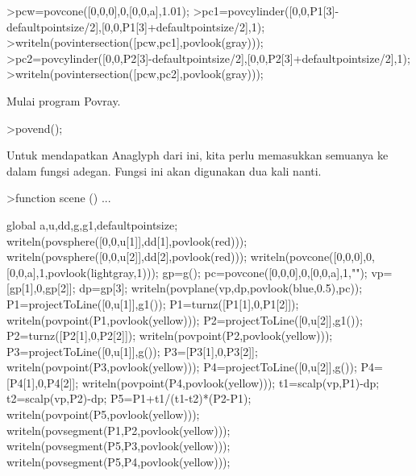 \documentclass[12pt,arial,letterpaper]{book}
\begin{document}
\begin{eulercomment}
\begin{eulercomment}
\begin{eulercomment}
\begin{eulercomment}
\begin{eulercomment}
\begin{eulercomment}
\begin{eulercomment}
\begin{eulercomment}
\begin{eulercomment}
\begin{eulercomment}
\begin{eulercomment}
\begin{eulercomment}
\begin{eulercomment}
\begin{eulercomment}
\begin{eulercomment}
\begin{eulercomment}
\begin{eulercomment}
\begin{eulercomment}
\begin{eulercomment}
\begin{eulercomment}
\begin{eulercomment}
\begin{eulercomment}
\begin{eulercomment}
\begin{eulercomment}
\begin{eulercomment}
\begin{eulercomment}
\begin{eulercomment}
\begin{eulercomment}
\begin{eulercomment}
\begin{eulercomment}
\begin{eulerprompt}
>pcw=povcone([0,0,0],0,[0,0,a],1.01);
>pc1=povcylinder([0,0,P1[3]-defaultpointsize/2],[0,0,P1[3]+defaultpointsize/2],1);
>writeln(povintersection([pcw,pc1],povlook(gray)));
>pc2=povcylinder([0,0,P2[3]-defaultpointsize/2],[0,0,P2[3]+defaultpointsize/2],1);
>writeln(povintersection([pcw,pc2],povlook(gray)));
\end{eulerprompt}
\begin{eulercomment}
Mulai program Povray.
\end{eulercomment}
\begin{eulerprompt}
>povend();
\end{eulerprompt}
\begin{eulercomment}
Untuk mendapatkan Anaglyph dari ini, kita perlu memasukkan semuanya ke
dalam fungsi adegan. Fungsi ini akan digunakan dua kali nanti.
\end{eulercomment}
\begin{eulerprompt}
>function scene () ...
\end{eulerprompt}
\begin{eulerudf}
  global a,u,dd,g,g1,defaultpointsize;
  writeln(povsphere([0,0,u[1]],dd[1],povlook(red)));
  writeln(povsphere([0,0,u[2]],dd[2],povlook(red)));
  writeln(povcone([0,0,0],0,[0,0,a],1,povlook(lightgray,1)));
  gp=g();
  pc=povcone([0,0,0],0,[0,0,a],1,"");
  vp=[gp[1],0,gp[2]]; dp=gp[3];
  writeln(povplane(vp,dp,povlook(blue,0.5),pc));
  P1=projectToLine([0,u[1]],g1()); P1=turnz([P1[1],0,P1[2]]);
  writeln(povpoint(P1,povlook(yellow)));
  P2=projectToLine([0,u[2]],g1()); P2=turnz([P2[1],0,P2[2]]);
  writeln(povpoint(P2,povlook(yellow)));
  P3=projectToLine([0,u[1]],g()); P3=[P3[1],0,P3[2]];
  writeln(povpoint(P3,povlook(yellow)));
  P4=projectToLine([0,u[2]],g()); P4=[P4[1],0,P4[2]];
  writeln(povpoint(P4,povlook(yellow)));
  t1=scalp(vp,P1)-dp; t2=scalp(vp,P2)-dp; P5=P1+t1/(t1-t2)*(P2-P1);
  writeln(povpoint(P5,povlook(yellow)));
  writeln(povsegment(P1,P2,povlook(yellow)));
  writeln(povsegment(P5,P3,povlook(yellow)));
  writeln(povsegment(P5,P4,povlook(yellow)));

\end{eulerudf}
\end{eulercomment}
\end{eulercomment}
\end{eulercomment}
\end{eulercomment}
\end{eulercomment}
\end{eulercomment}
\end{eulercomment}
\end{eulercomment}
\end{eulercomment}
\end{eulercomment}
\end{eulercomment}
\end{eulercomment}
\end{eulercomment}
\end{eulercomment}
\end{eulercomment}
\end{eulercomment}
\end{eulercomment}
\end{eulercomment}
\end{eulercomment}
\end{eulercomment}
\end{eulercomment}
\end{eulercomment}
\end{eulercomment}
\end{eulercomment}
\end{eulercomment}
\end{eulercomment}
\end{eulercomment}
\end{eulercomment}
\end{eulercomment}
\end{eulercomment}
\end{document}
